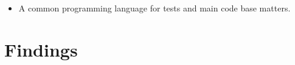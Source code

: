 \begin{itemize}
  \item A common programming language for tests and main code base matters.
\end{itemize}

\section{Findings}

